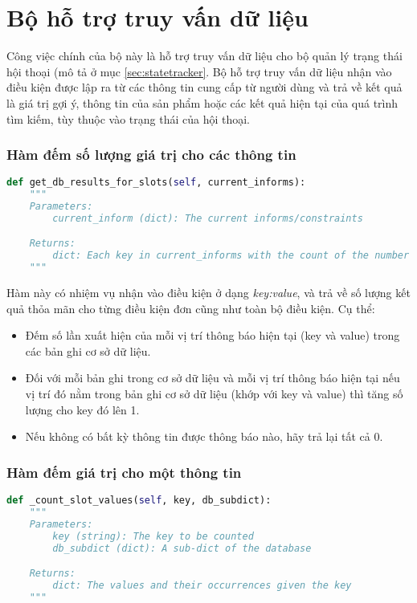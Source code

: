 \section{Bộ hỗ trợ truy vấn dữ liệu}
Công việc chính của bộ này là hỗ trợ truy vấn dữ liệu cho bộ quản lý trạng thái hội thoại (mô tả ở mục \ref{sec:statetracker}. Bộ hỗ trợ truy vấn dữ liệu nhận vào điều kiện được lập ra từ các thông tin cung cấp từ người dùng và trả về kết quả là giá trị gợi ý, thông tin của sản phẩm hoặc các kết quả hiện tại của quá trình tìm kiếm, tùy thuộc vào trạng thái của hội thoại.

\subsubsection{Hàm đếm số lượng giá trị cho các thông tin}

\renewcommand{\lstlistingname}{Hàm}
\begin{lstlisting}[caption={Hàm đếm số lượng giá trị cho các thông tin},language=python,firstnumber=1]
def get_db_results_for_slots(self, current_informs):
    """
    Parameters:
        current_inform (dict): The current informs/constraints

    Returns:
        dict: Each key in current_informs with the count of the number of matches for that key
    """
\end{lstlisting}

Hàm này có nhiệm vụ nhận vào điều kiện ở dạng \textit{key:value}, và trả về số lượng kết quả thỏa mãn cho từng điều kiện đơn cũng như toàn bộ điều kiện. Cụ thể:

\begin{itemize}
    \item Đếm số lần xuất hiện của mỗi vị trí thông báo hiện tại (key và value) trong các bản ghi cơ sở dữ liệu.
    \item Đối với mỗi bản ghi trong cơ sở dữ liệu và mỗi vị trí thông báo hiện tại nếu vị trí đó nằm trong bản ghi cơ sở dữ liệu (khớp với key và value) thì tăng số lượng cho key đó lên 1.
    \item Nếu không có bất kỳ thông tin được thông báo nào, hãy trả lại tất cả 0.
\end{itemize}

\subsubsection{Hàm đếm giá trị cho một thông tin}

\renewcommand{\lstlistingname}{Hàm}
\begin{lstlisting}[caption={Hàm đếm giá trị cho một thông tin},language=python,firstnumber=1]
def _count_slot_values(self, key, db_subdict):
    """
    Parameters:
        key (string): The key to be counted
        db_subdict (dict): A sub-dict of the database

    Returns:
        dict: The values and their occurrences given the key
    """
\end{lstlisting}

